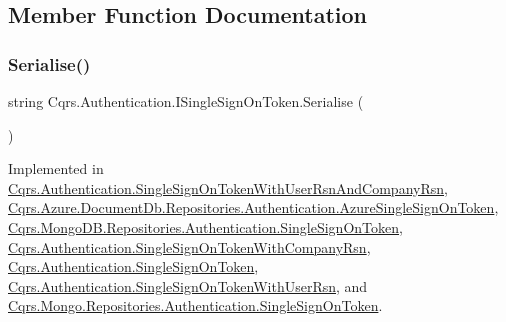 \subsection{Member Function Documentation}
\mbox{\label{interfaceCqrs_1_1Authentication_1_1ISingleSignOnToken_af34e8c0b052865d687064d3381bfbcdb}} 
\subsubsection{\texorpdfstring{Serialise()}{Serialise()}}
{\footnotesize\ttfamily string Cqrs.\+Authentication.\+I\+Single\+Sign\+On\+Token.\+Serialise (\begin{DoxyParamCaption}{ }\end{DoxyParamCaption})}



Implemented in \hyperlink{classCqrs_1_1Authentication_1_1SingleSignOnTokenWithUserRsnAndCompanyRsn_a8d44249c00e5264dc7b37f4868836a80}{Cqrs.\+Authentication.\+Single\+Sign\+On\+Token\+With\+User\+Rsn\+And\+Company\+Rsn}, \hyperlink{classCqrs_1_1Azure_1_1DocumentDb_1_1Repositories_1_1Authentication_1_1AzureSingleSignOnToken_a55c07b93600e6863985b50d4df346af0}{Cqrs.\+Azure.\+Document\+Db.\+Repositories.\+Authentication.\+Azure\+Single\+Sign\+On\+Token}, \hyperlink{classCqrs_1_1MongoDB_1_1Repositories_1_1Authentication_1_1SingleSignOnToken_a2392ecdb53f1f2a38a67d80a77f11ba4}{Cqrs.\+Mongo\+D\+B.\+Repositories.\+Authentication.\+Single\+Sign\+On\+Token}, \hyperlink{classCqrs_1_1Authentication_1_1SingleSignOnTokenWithCompanyRsn_a0bc9f0fae90121d029fe0730708f4210}{Cqrs.\+Authentication.\+Single\+Sign\+On\+Token\+With\+Company\+Rsn}, \hyperlink{classCqrs_1_1Authentication_1_1SingleSignOnToken_a5e859c6c5db5aaa9ef4e8f2086df4604}{Cqrs.\+Authentication.\+Single\+Sign\+On\+Token}, \hyperlink{classCqrs_1_1Authentication_1_1SingleSignOnTokenWithUserRsn_a8103820e6352c10b3990fb027dd9b5ae}{Cqrs.\+Authentication.\+Single\+Sign\+On\+Token\+With\+User\+Rsn}, and \hyperlink{classCqrs_1_1Mongo_1_1Repositories_1_1Authentication_1_1SingleSignOnToken_ab0ad6b0a6065a2553a093214e5a033b5}{Cqrs.\+Mongo.\+Repositories.\+Authentication.\+Single\+Sign\+On\+Token}.



